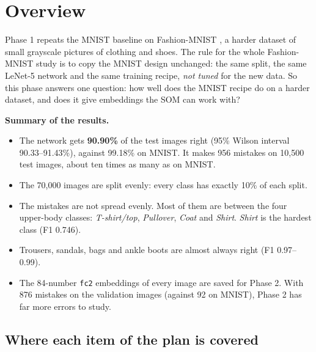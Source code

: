 \documentclass[11pt]{article}
\begin{document}
\setcounter{page}{2}
\newcommand{\tbd}{\textbf{[TBD]}}

\section{Overview}

Phase 1 repeats the MNIST baseline on Fashion-MNIST \cite{xiao2017fashion}, a harder dataset of small grayscale pictures of clothing and shoes. The rule for the whole Fashion-MNIST study is to copy the MNIST design unchanged: the same split, the same LeNet-5 network and the same training recipe, \emph{not tuned} for the new data. So this phase answers one question: how well does the MNIST recipe do on a harder dataset, and does it give embeddings the SOM can work with?

\textbf{Summary of the results.}
\begin{itemize}[leftmargin=1.4em, itemsep=1pt]
  \item The network gets \textbf{90.90\%} of the test images right (95\% Wilson interval 90.33--91.43\%), against 99.18\% on MNIST. It makes 956 mistakes on 10,500 test images, about ten times as many as on MNIST.
  \item The 70,000 images are split evenly: every class has exactly 10\% of each split.
  \item The mistakes are not spread evenly. Most of them are between the four upper-body classes: \emph{T-shirt/top}, \emph{Pullover}, \emph{Coat} and \emph{Shirt}. \emph{Shirt} is the hardest class (F1 0.746).
  \item Trousers, sandals, bags and ankle boots are almost always right (F1 0.97--0.99).
  \item The 84-number \texttt{fc2} embeddings of every image are saved for Phase 2. With 876 mistakes on the validation images (against 92 on MNIST), Phase 2 has far more errors to study.
\end{itemize}

\subsection*{Where each item of the plan is covered}
\end{document}
